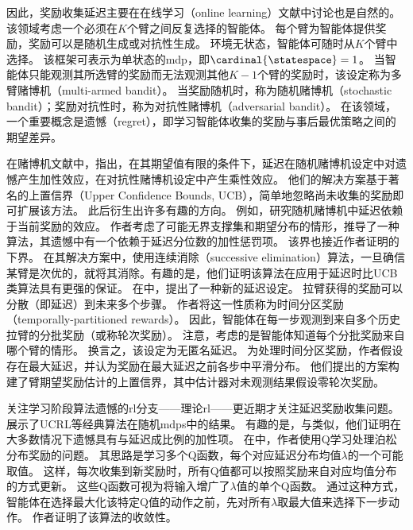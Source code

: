 因此，奖励收集延迟主要在在线学习（online learning）文献中讨论也是自然的。
该领域考虑一个必须在$K$个臂之间反复选择的智能体。
每个臂为智能体提供奖励，奖励可以是随机生成或对抗性生成。
环境无状态，智能体可随时从$K$个臂中选择。
该框架可表示为单状态的\gls{mdp}，即$\cardinal{\statespace}=1$。
当智能体只能观测其所选臂的奖励而无法观测其他$K-1$个臂的奖励时，该设定称为多臂赌博机（multi-armed bandit）\cite{lattimore2020bandit}。
当奖励随机时，称为随机赌博机（stochastic bandit）；奖励对抗性时，称为对抗性赌博机（adversarial bandit）。
在该领域，一个重要概念是遗憾（regret），即学习智能体收集的奖励与事后最优策略之间的期望差异。

在赌博机文献中，\cite{joulani2013online}指出，在其期望值有限的条件下，延迟在随机赌博机设定中对遗憾产生加性效应，在对抗性赌博机设定中产生乘性效应。
他们的解决方案基于著名的上置信界（Upper Confidence Bounds, UCB）\cite{auer2002finite}，简单地忽略尚未收集的奖励即可扩展该方法。
此后衍生出许多有趣的方向。
例如，\cite{lancewicki2021stochastic}研究随机赌博机中延迟依赖于当前奖励的效应。
作者考虑了可能无界支撑集和期望分布的情形，推导了一种算法，其遗憾中有一个依赖于延迟分位数的加性惩罚项。
该界也接近作者证明的下界。
在其解决方案中，\cite{lancewicki2021stochastic}使用连续消除（successive elimination）算法，一旦确信某臂是次优的，就将其消除。有趣的是，他们证明该算法在应用于延迟时比UCB类算法具有更强的保证。
在\cite{romano2022multi}中，提出了一种新的延迟设定。
拉臂获得的奖励可以分散（即延迟）到未来多个步骤。
作者将这一性质称为时间分区奖励（temporally-partitioned rewards）。
因此，智能体在每一步观测到来自多个历史拉臂的分批奖励（或称轮次奖励）。
注意，\cite{romano2022multi}考虑的是智能体知道每个分批奖励来自哪个臂的情形。
换言之，该设定为无匿名延迟。
为处理时间分区奖励，作者假设存在最大延迟，并认为奖励在最大延迟之前各步中平滑分布。
他们提出的方案构建了臂期望奖励估计的上置信界，其中估计器对未观测结果假设零轮次奖励。

关注学习阶段算法遗憾的\gls{rl}分支——理论\gls{rl}——更近期才关注延迟奖励收集问题。
\cite{howson2021delayed}展示了UCRL\cite{auer2008near}等经典算法在随机\glspl{mdp}中的结果。
有趣的是，与\cite{joulani2013online}类似，他们证明在大多数情况下遗憾具有与延迟成比例的加性项。
在\cite{campbell2016multiple}中，作者使用Q学习处理泊松分布奖励的问题。
其思路是学习多个Q函数，每个对应延迟分布均值$\lambda$的一个可能取值。
这样，每次收集到新奖励时，所有Q值都可以按照奖励来自对应均值分布的方式更新。
这些Q函数可视为将输入增广了$\lambda$值的单个Q函数。
通过这种方式，智能体在选择最大化该特定Q值的动作之前，先对所有$\lambda$取最大值来选择下一步动作。
作者证明了该算法的收敛性。

